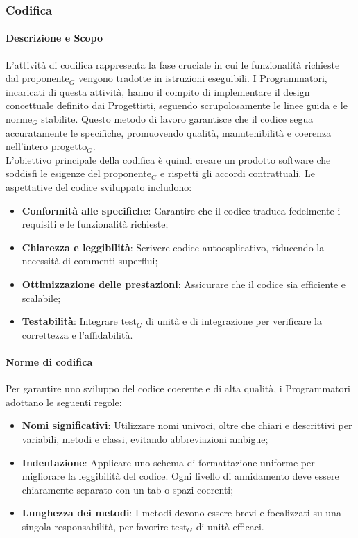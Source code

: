 \documentclass[10pt]{article}
\begin{document}
\begin{justify}
    \subsubsection{Codifica}
    \label{codifica}
        \paragraph{Descrizione e Scopo}
        L'attività di codifica rappresenta la fase cruciale in cui le funzionalità richieste dal proponente$_G$ vengono tradotte in istruzioni eseguibili. I Programmatori, incaricati di questa attività, hanno il compito di implementare il design concettuale definito dai Progettisti, seguendo scrupolosamente le linee guida e le norme$_G$ stabilite. Questo metodo di lavoro garantisce che il codice segua accuratamente le specifiche, promuovendo qualità, manutenibilità e coerenza nell'intero progetto$_G$.\\
        L'obiettivo principale della codifica è quindi creare un prodotto software che soddisfi le esigenze del proponente$_G$ e rispetti gli accordi contrattuali. Le aspettative del codice sviluppato includono:
        \begin{itemize}
            \item \textbf{Conformità alle specifiche}: Garantire che il codice traduca fedelmente i requisiti e le funzionalità richieste;
            \item \textbf{Chiarezza e leggibilità}: Scrivere codice autoesplicativo, riducendo la necessità di commenti superflui;
            \item \textbf{Ottimizzazione delle prestazioni}: Assicurare che il codice sia efficiente e scalabile;
            \item \textbf{Testabilità}: Integrare test$_G$ di unità e di integrazione per verificare la correttezza e l'affidabilità.
        \end{itemize}

        \paragraph{Norme di codifica}
        Per garantire uno sviluppo del codice coerente e di alta qualità, i Programmatori adottano le seguenti regole:
        \begin{itemize}
            \item \textbf{Nomi significativi}: Utilizzare nomi univoci, oltre che chiari e descrittivi per variabili, metodi e classi, evitando abbreviazioni ambigue;
            \item \textbf{Indentazione}: Applicare uno schema di formattazione uniforme per migliorare la leggibilità del codice. Ogni livello di annidamento deve essere chiaramente separato con un tab o spazi coerenti;
            \item \textbf{Lunghezza dei metodi}: I metodi devono essere brevi e focalizzati su una singola responsabilità, per favorire test$_G$ di unità efficaci.
        \end{itemize}


\end{justify}
\end{document}
